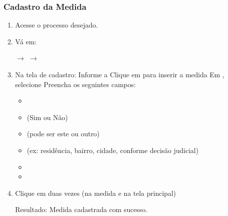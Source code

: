 \documentclass[letterpaper,10pt,brazil]{sphinxmanual}
\begin{document}
\subsubsection{Cadastro da Medida}
\label{\detokenize{projud_56_cadastromedidacautelar:cadastro-da-medida}}\begin{enumerate}
%
\item {} 
\sphinxAtStartPar
Acesse o processo desejado.

\item {} 
\sphinxAtStartPar
Vá em:

\sphinxAtStartPar
{} \(\rightarrow\)  \(\rightarrow\) 

\item {} 
\sphinxAtStartPar
Na tela de cadastro:
\sphinxhyphen{} Informe a 
\sphinxhyphen{} Clique em  para inserir a medida
\sphinxhyphen{} Em , selecione 
\sphinxhyphen{} Preencha os seguintes campos:
\begin{itemize}
\item {} 
\sphinxAtStartPar
{}

\item {} 
\sphinxAtStartPar
{} (Sim ou Não)

\item {} 
\sphinxAtStartPar
{} (pode ser este ou outro)

\item {} 
\sphinxAtStartPar
{} (ex: residência, bairro, cidade, conforme decisão judicial)

\item {} 
\sphinxAtStartPar
{}

\item {} 
\sphinxAtStartPar
{}

\end{itemize}

\item {} 
\sphinxAtStartPar
Clique em  duas vezes (na medida e na tela principal)

\sphinxAtStartPar
Resultado: Medida cadastrada com sucesso.

\end{enumerate}
\end{document}
